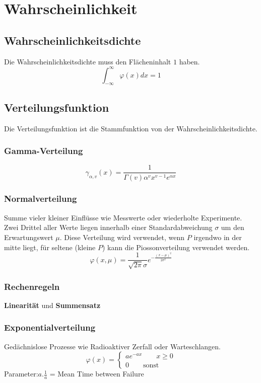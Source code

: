 \section{Wahrscheinlichkeit}
\subsection{Wahrscheinlichkeitsdichte}
Die Wahrscheinlichkeitsdichte muss den Flächeninhalt $1$ haben.
\[
\int_{-\infty}^{\infty}\varphi(x)dx = 1
\]

\subsection{Verteilungsfunktion}
Die Verteilungsfunktion ist die Stammfunktion von der Wahrscheinlichkeitsdichte.


\subsubsection{Gamma-Verteilung}
\[
\gamma_{\alpha,v}(x) = \frac{1}{\Gamma(v)\alpha^vx^{v-1}e^{\alpha x}}
\]

\subsubsection{Normalverteilung}
Summe vieler kleiner Einflüsse wie Messwerte oder wiederholte Experimente. Zwei Drittel aller Werte liegen innerhalb einer Standardabweichung $\sigma$ um den Erwartungswert $\mu$. Diese Verteilung wird verwendet, wenn $P$ irgendwo in der mitte liegt, für seltene (kleine $P$) kann die Piossonverteilung verwendet werden.
\[
\varphi(x, \mu) = \frac{1}{\sqrt{2\pi}\sigma}e^{-\frac{(x-\mu)^2}{2\sigma^2}}
\]

\subsubsection{Rechenregeln}
\textbf{Linearität} und \textbf{Summensatz}

\subsubsection{Exponentialverteilung}
Gedächnislose Prozesse wie Radioaktiver Zerfall oder Warteschlangen.
\[\varphi(x) = \begin{cases*}
	ae^{-ax} \qquad x \geq 0 \\
	0 \qquad \text{sonst}
\end{cases*}\]
Parameter:$a. \frac{1}{a}$ = Mean Time between Failure

